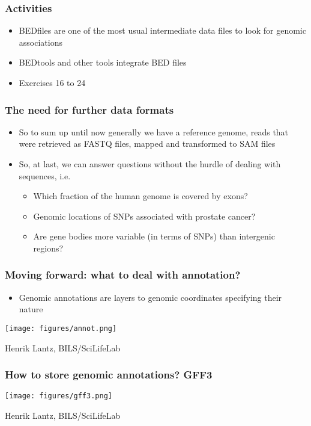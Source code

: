 \documentclass{beamer}
\begin{document}
\begin{frame}
  \frametitle{Activities}
  \begin{itemize}
  \item BEDfiles are one of the most usual intermediate data files to look for genomic associations
  \item BEDtools and other tools integrate BED files
  \item Exercises 16 to 24
  \end{itemize}
\end{frame}


\begin{frame}
  \frametitle{The need for further data formats}
  \begin{itemize}
  \item So to sum up until now generally we have a reference genome, reads that were retrieved as FASTQ files, mapped and transformed to SAM files 
  \item So, at last, we can answer questions without the hurdle of dealing with sequences, i.e.
    \begin{itemize}
    \item Which fraction of the human genome is covered by exons? 
    \item Genomic locations of SNPs associated with prostate cancer?
    \item Are gene bodies more variable (in terms of SNPs) than intergenic regions?
    \end{itemize}
  \end{itemize}
\end{frame}



\begin{frame}
  \frametitle{Moving forward: what to deal with annotation?}
  \begin{itemize}
  \item Genomic annotations are layers to genomic coordinates specifying their nature
  \end{itemize}
\centering
\texttt{[image: figures/annot.png]}

Henrik Lantz, BILS/SciLifeLab
\end{frame}


\begin{frame}
  \frametitle{How to store genomic annotations? GFF3}
  
\centering
\texttt{[image: figures/gff3.png]}

Henrik Lantz, BILS/SciLifeLab
\end{frame}
\end{document}
